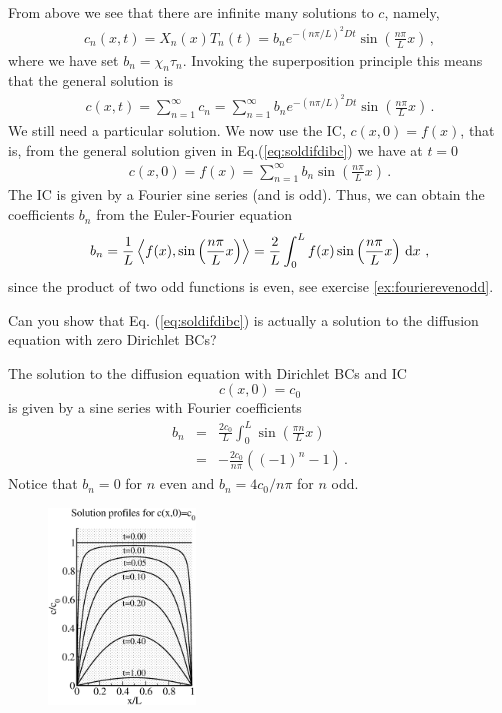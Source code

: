 From above we see that there are infinite many solutions to $c$, namely, 
\begin{eqnarray}
	c_n(x,t) = X_n(x)T_n(t) = b_n  e^{-(n\pi/L)^2Dt}  \sin\left(\frac{n\pi}{L} x\right) \, ,
\end{eqnarray}
where we have set $b_n = \chi_n\tau_n$. Invoking the superposition principle this means that the 
general solution is
\begin{eqnarray}
	\label{eq:soldifdibc}
	c(x,t) = \sum_{n=1}^\infty c_n = \sum_{n=1}^\infty b_n  e^{-(n\pi/L)^2Dt}  \sin\left(\frac{n\pi}{L} x\right)
	\, .
\end{eqnarray}
We still need a particular solution. We now use the IC, $c(x,0)=f(x)$, that is, from the general 
solution given in Eq.(\ref{eq:soldifdibc}) we have at $t=0$
\begin{eqnarray}
	\label{eq:soldiffDirichelt}
	c(x, 0) = f(x) = \sum_{n=1}^\infty b_n  \sin\left(\frac{n\pi}{L} x\right) \, .
\end{eqnarray}
The IC is given by a Fourier sine series (and is odd). Thus, we can obtain the coefficients $b_n$ from the 
Euler-Fourier equation
\begin{eqnarray}
	\label{eq:bnf}
	b_n = \frac{1}{L}\left\langle f(x), \sin\left(\frac{n\pi}{L} x\right) \right \rangle= 
	 \frac{2}{L} \int_{0}^L f(x) \sin\left(\frac{n\pi}{L} x\right) \, \mathrm{d} x \ ,
\end{eqnarray}
since the product of two odd functions is even, see exercise \ref{ex:fourierevenodd}. 

\begin{question}
	Can you show that Eq. (\ref{eq:soldifdibc}) is actually a solution to the diffusion equation with zero Dirichlet BCs?
\end{question}	

\begin{example}
	The solution to the diffusion equation with Dirichlet BCs and IC
	\[
		c(x,0) = c_0 
	\] 
	is given by a sine series with Fourier coefficients
	\begin{eqnarray}
		b_n &=& \frac{2c_0}{L} \int_0^L \sin\left( \frac{\pi n}{L} x \right) \nonumber \\
			&=& -\frac{2c_0}{n\pi}( (-1)^n - 1) \, .
	\end{eqnarray}
	Notice that $b_n = 0$ for $n$ even and $b_n = 4c_0/n\pi$ for $n$ odd.
\end{example}	

\begin{figure}
	\centering
	\includegraphics[width=0.35\textwidth]{figs/diffDBC.eps}
\end{figure}


